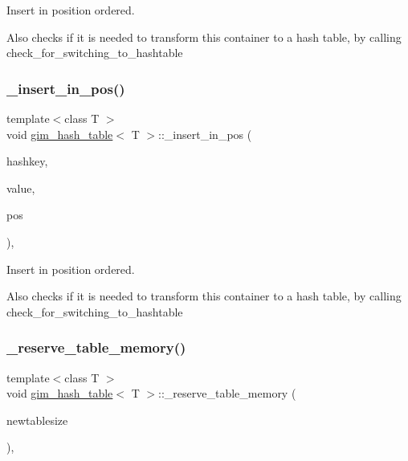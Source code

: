 Insert in position ordered. 

Also checks if it is needed to transform this container to a hash table, by calling check\+\_\+for\+\_\+switching\+\_\+to\+\_\+hashtable \mbox{\label{classgim__hash__table_a3eacaf88e1b18815c0b89d368d77a93a}} 
\subsubsection{\texorpdfstring{\+\_\+insert\+\_\+in\+\_\+pos()}{\_insert\_in\_pos()}\hspace{0.1cm}{\footnotesize\ttfamily [2/2]}}
{\footnotesize\ttfamily template$<$class T $>$ \\
void \hyperlink{classgim__hash__table}{gim\+\_\+hash\+\_\+table}$<$ T $>$\+::\+\_\+insert\+\_\+in\+\_\+pos (\begin{DoxyParamCaption}\item[{G\+U\+I\+NT}]{hashkey,  }\item[{const T \&}]{value,  }\item[{G\+U\+I\+NT}]{pos }\end{DoxyParamCaption})\hspace{0.3cm}{\ttfamily [inline]}, {\ttfamily [protected]}}



Insert in position ordered. 

Also checks if it is needed to transform this container to a hash table, by calling check\+\_\+for\+\_\+switching\+\_\+to\+\_\+hashtable \mbox{\label{classgim__hash__table_a4d9347e131c0e17ac2d4966c092817f8}} 
\subsubsection{\texorpdfstring{\+\_\+reserve\+\_\+table\+\_\+memory()}{\_reserve\_table\_memory()}\hspace{0.1cm}{\footnotesize\ttfamily [1/2]}}
{\footnotesize\ttfamily template$<$class T $>$ \\
void \hyperlink{classgim__hash__table}{gim\+\_\+hash\+\_\+table}$<$ T $>$\+::\+\_\+reserve\+\_\+table\+\_\+memory (\begin{DoxyParamCaption}\item[{G\+U\+I\+NT}]{newtablesize }\end{DoxyParamCaption})\hspace{0.3cm}{\ttfamily [inline]}, {\ttfamily [protected]}}



